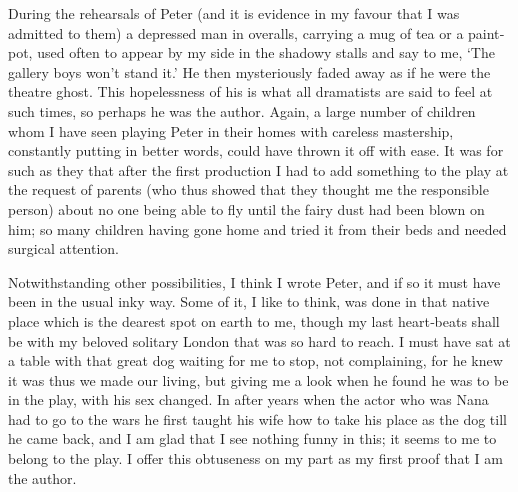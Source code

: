 During the rehearsals of Peter
(and it is evidence in my favour that I was admitted to them)
a depressed man in overalls, carrying a mug of tea or a paint‐pot,
used often to appear by my side in the shadowy stalls and say to me,
‘The gallery boys won’t stand it.’
He then mysteriously faded away as if he were the theatre ghost.
This hopelessness of his is what all dramatists are said to feel at such times,
so perhaps he was the author.
Again, a large number of children whom I have seen playing Peter in their homes
with careless mastership, constantly putting in better words,
could have thrown it off with ease.
It was for such as they that after the first production
I had to add something to the play at the request of parents
(who thus showed that they thought me the responsible person)
about no one being able to fly until the fairy dust had been blown on him;
so many children having gone home and tried it from their beds and needed surgical attention.

Notwithstanding other possibilities, I think I wrote Peter,
and if so it must have been in the usual inky way.
Some of it, I like to think, was done in that native place which is the dearest spot on earth to me,
though my last heart‐beats shall be with my beloved solitary London that was so hard to reach.
I must have sat at a table with that great dog waiting for me to stop,
not complaining, for he knew it was thus we made our living,
but giving me a look when he found he was to be in the play, with his sex changed.
In after years when the actor who was Nana had to go to the wars
he first taught his wife how to take his place as the dog till he came back,
and I am glad that I see nothing funny in this;
it seems to me to belong to the play.
I offer this obtuseness on my part as my first proof that I am the author.


